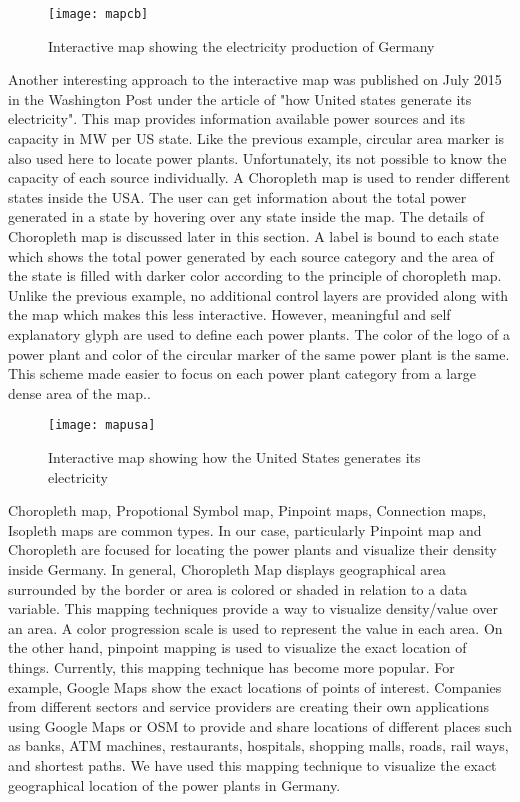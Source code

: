 \begin{figure}
  \begin{center}
    \texttt{[image: mapcb]}
    \caption{Interactive map showing the electricity production of Germany}
    \label{fig:mapcb}
  \end{center}
\end{figure}

Another interesting approach to the interactive map was published on July 2015 in the Washington Post \cite{wp2015} under the article of "how United states generate its electricity". This map provides information available power sources and its capacity in MW per US state. Like the previous example, circular area marker is also used here to locate power plants. Unfortunately, its not possible to know the capacity of each source individually. A Choropleth map is used to render different states inside the USA. The user can get information about the total power generated in a state by hovering over any state inside the map. The details of Choropleth map is discussed later in this section. A label is bound to each state which shows the total power generated by each source category and the area of the state is filled with darker color according to the principle of choropleth map. Unlike the previous example, no additional control layers are provided along with the map which makes this less interactive. However, meaningful and self explanatory glyph are used to define each power plants. The color of the logo of a power plant and color of the circular marker of the same power plant is the same. This scheme made easier to focus on each power plant category from a large dense area of the map..

\begin{figure}
  \begin{center}
    \texttt{[image: mapusa]}
    \caption{Interactive map showing how the United States generates its electricity}
    \label{fig:mapusa}
  \end{center}
\end{figure}

Choropleth map, Propotional Symbol map, Pinpoint maps, Connection maps, Isopleth maps are common types. In our case, particularly Pinpoint map and Choropleth are focused for locating the power plants and visualize their density inside Germany. In general, Choropleth Map displays geographical area surrounded by the border or area is colored or shaded in relation to a data variable. This mapping techniques provide a way to visualize density/value over an area. A color progression scale is used to represent the value in each area. On the other hand, pinpoint mapping is used to visualize the exact location of things. Currently, this mapping technique has become more popular. For example, Google Maps show the exact locations of points of interest. Companies from different sectors and service providers are creating their own applications using Google Maps or OSM to provide and share locations of different places such as banks, ATM machines, restaurants, hospitals, shopping malls, roads, rail ways, and shortest paths. We have used this mapping technique to visualize the exact geographical location of the power plants in Germany.

